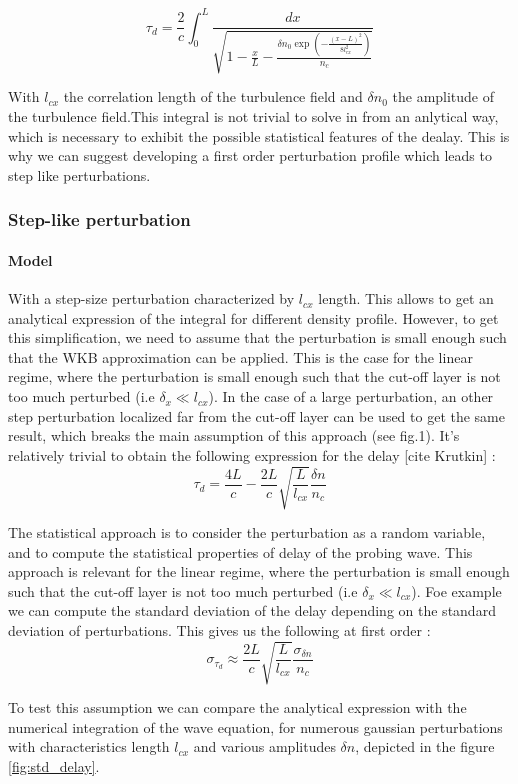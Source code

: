 \documentclass[11pt,a4paper,openany]{report}
\begin{document}
\begin{multicols}{2}
    $$\tau_d = \frac{2}{c} \int_0^L \frac{dx}{\sqrt{1 - \frac{x}{L} - \frac{\delta n_0  \exp(-\frac{(x - L)^2}{8l_{cx}^2})}{n_c}}}$$

    With $l_{cx}$ the correlation length of the turbulence field and $\delta n_0$ the amplitude of the turbulence field.This integral is not trivial to solve in from an anlytical way, which is necessary to exhibit the possible statistical features of the dealay. This is why we can suggest developing a first order perturbation profile which leads to step like perturbations.

    \subsubsection{Step-like perturbation}
    \paragraph{Model}

    With a step-size perturbation characterized by $l_{cx}$ length. This allows to get an analytical expression of the integral for different density profile. However, to get this simplification, we need to assume that the perturbation is small enough such that the WKB approximation can be applied.
    This is the case for the linear regime, where the perturbation is small enough such that the cut-off layer is not too much perturbed (i.e $\delta_x \ll l_{cx}$). In the case of a large perturbation, an other step perturbation localized far from the cut-off layer can be used to get the same result, which breaks the main assumption of this approach (see fig.1).
    It's relatively trivial to obtain the following expression for the delay [cite Krutkin] :
    $$\tau_d = \frac{4L}{c} - \frac{2L}{c}\sqrt{\frac{L}{l_{cx}}}\frac{\delta n}{n_c} $$

    The statistical approach is to consider the perturbation as a random variable, and to compute the statistical properties of delay of the probing wave. This approach is relevant for the linear regime, where the perturbation is small enough such that the cut-off layer is not too much perturbed (i.e $\delta_x \ll l_{cx}$). Foe example we can compute the standard deviation of the delay depending on the standard deviation of perturbations.
    This gives us the following at first order :
    $$\sigma_{\tau_d} \approx \frac{2L}{c}\sqrt{\frac{L}{l_{cx}}}\frac{\sigma_{\delta n}}{n_c}$$

    To test this assumption we can compare the analytical expression with the numerical integration of the wave equation, for numerous gaussian perturbations with characteristics length $l_{cx}$ and various amplitudes $\delta n$, depicted in the figure \ref{fig:std_delay}.
\end{multicols}
\end{document}

